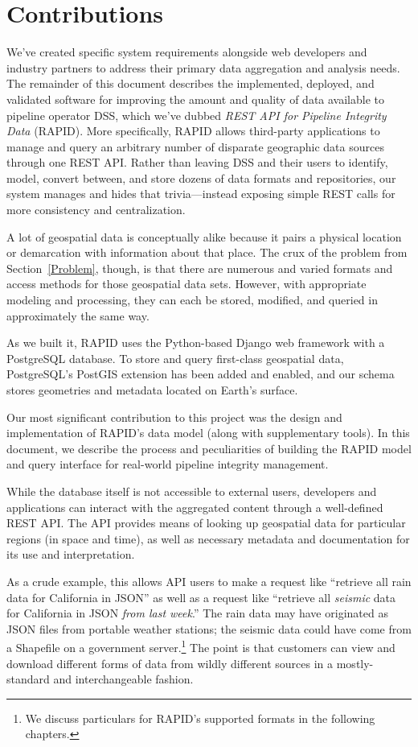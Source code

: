 \section{Contributions}
We've created specific system requirements alongside web developers and industry partners to address their primary data aggregation and analysis needs. The remainder of this document describes the implemented, deployed, and validated software for improving the amount and quality of data available to pipeline operator DSS, which we've dubbed \textit{REST API for Pipeline Integrity Data} (RAPID). More specifically, RAPID allows third-party applications to manage and query an arbitrary number of disparate geographic data sources through one REST API. Rather than leaving DSS and their users to identify, model, convert between, and store dozens of data formats and repositories, our system manages and hides that trivia---instead exposing simple REST calls for more consistency and centralization.

A lot of geospatial data is conceptually alike because it pairs a physical location or demarcation with information about that place. The crux of the problem from Section~\ref{Problem}, though, is that there are numerous and varied formats and access methods for those geospatial data sets. However, with appropriate modeling and processing, they can each be stored, modified, and queried in approximately the same way.

As we built it, RAPID uses the Python-based Django web framework with a PostgreSQL database. To store and query first-class geospatial data, PostgreSQL's PostGIS extension has been added and enabled, and our schema stores geometries and metadata located on Earth's surface.

Our most significant contribution to this project was the design and implementation of RAPID's data model (along with supplementary tools). In this document, we describe the process and peculiarities of building the RAPID model and query interface for real-world pipeline integrity management.

While the database itself is not accessible to external users, developers and applications can interact with the aggregated content through a well-defined REST API. The API provides means of looking up geospatial data for particular regions (in space and time), as well as necessary metadata and documentation for its use and interpretation.

As a crude example, this allows API users to make a request like ``retrieve all rain data for California in JSON'' as well as a request like ``retrieve all \textit{seismic} data for California in JSON \textit{from last week}.'' The rain data may have originated as JSON files from portable weather stations; the seismic data could have come from a Shapefile on a government server.\footnote{We discuss particulars for RAPID's supported formats in the following chapters.} The point is that customers can view and download different forms of data from wildly different sources in a mostly-standard and interchangeable fashion.

